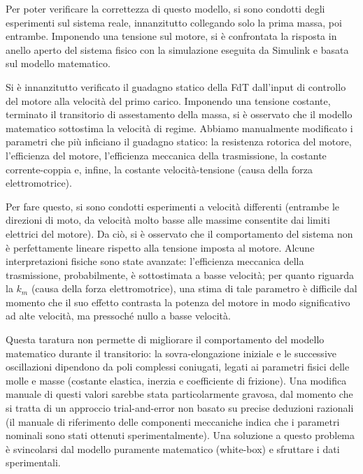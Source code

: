 

Per poter verificare la correttezza di questo modello, si sono condotti degli esperimenti sul sistema reale, innanzitutto collegando solo la prima massa, poi entrambe.
Imponendo una tensione sul motore, si è confrontata la risposta in anello aperto del sistema fisico con la simulazione eseguita da Simulink e basata sul modello matematico.


Si è innanzitutto verificato il guadagno statico della FdT dall'input di controllo del motore alla velocità del primo carico. Imponendo una tensione costante, terminato il transitorio di assestamento della massa, si è osservato che il modello matematico sottostima la velocità di regime.
Abbiamo manualmente modificato i parametri che più inficiano il guadagno statico: la resistenza rotorica del motore, l'efficienza del motore, l'efficienza meccanica della trasmissione, la costante corrente-coppia e, infine, la costante velocità-tensione (causa della forza elettromotrice).

Per fare questo, si sono condotti esperimenti a velocità differenti (entrambe le direzioni di moto, da velocità molto basse alle massime consentite dai limiti elettrici del motore). Da ciò, si è osservato che il comportamento del sistema non è perfettamente lineare rispetto alla tensione imposta al motore. Alcune interpretazioni fisiche sono state avanzate: l'efficienza meccanica della trasmissione, probabilmente, è sottostimata a basse velocità; per quanto riguarda la $k_m$ (causa della forza elettromotrice), una stima di tale parametro è difficile dal momento che il suo effetto contrasta la potenza del motore in modo significativo ad alte velocità, ma pressoché nullo a basse velocità.


Questa taratura non permette di migliorare il comportamento del modello matematico durante il transitorio: la sovra-elongazione iniziale e le successive oscillazioni dipendono da poli complessi coniugati, legati ai parametri fisici delle molle e masse (costante elastica, inerzia e coefficiente di frizione). Una modifica manuale di questi valori sarebbe stata particolarmente gravosa, dal momento che si tratta di un approccio trial-and-error non basato su precise deduzioni razionali (il manuale di riferimento delle componenti meccaniche indica che i parametri nominali sono stati ottenuti sperimentalmente).
Una soluzione a questo problema è svincolarsi dal modello puramente matematico (white-box) e sfruttare i dati sperimentali.


